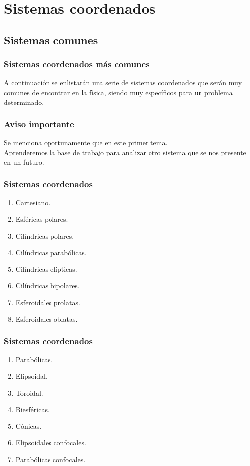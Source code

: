 \documentclass[12pt]{beamer}
\begin{document}
\section{Sistemas coordenados}
\subsection{Sistemas comunes}

\begin{frame}
\frametitle{Sistemas coordenados más comunes}
A continuación se enlistarán una serie de sistemas coordenados que serán muy comunes de encontrar en la física, siendo muy específicos para un problema determinado.
\end{frame}
\begin{frame}
\frametitle{Aviso importante}
Se menciona oportunamente que  en este primer tema.
\\
\bigskip
\pause
Aprenderemos la base de trabajo para analizar otro sistema que se nos presente en un futuro.
\end{frame}
\begin{frame}
\frametitle{Sistemas coordenados}
\begin{enumerate}[<+->]
\item Cartesiano.
\item Esféricas polares.
\item Cilíndricas polares.
\item Cilíndricas parabólicas.
\item Cilíndricas elípticas.
\item Cilíndricas bipolares.
\item Esferoidales prolatas.
\item Esferoidales oblatas.
\seti
\end{enumerate}
\end{frame}
\begin{frame}
\frametitle{Sistemas coordenados}
\begin{enumerate}[<+->]
\conti
\item Parabólicas.
\item Elipsoidal.
\item Toroidal.
\item Biesféricas.
\item Cónicas.
\item Elipsoidales confocales.
\item Parabólicas confocales.
\end{enumerate}
\end{frame}
\end{document}
